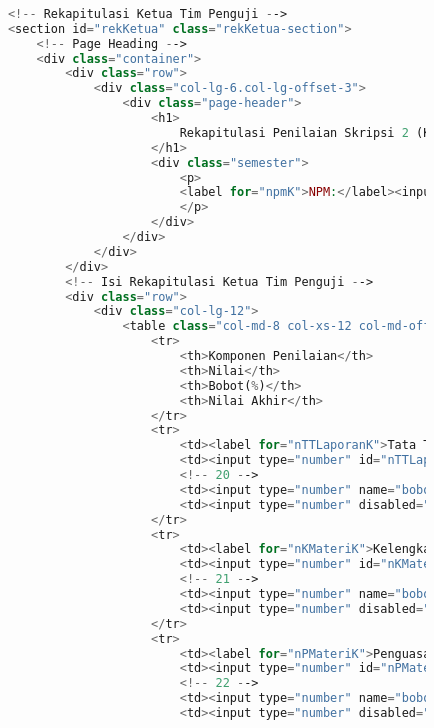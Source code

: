 \begin{lstlisting}[language=PHP,basicstyle=\tiny,caption=skripsi.php]
			
			<!-- Rekapitulasi Ketua Tim Penguji -->
			<section id="rekKetua" class="rekKetua-section">
				<!-- Page Heading -->
				<div class="container">
					<div class="row">
						<div class="col-lg-6.col-lg-offset-3">
							<div class="page-header">
								<h1>
									Rekapitulasi Penilaian Skripsi 2 (Ketua Tim Penguji)
								</h1>
								<div class="semester">
									<p> 
									<label for="npmK">NPM:</label><input id="nmpK" maxlength="10" value="{{ n_npm}}" disabled="disabled" />
									</p>
								</div>
							</div>
						</div>
					</div>
					<!-- Isi Rekapitulasi Ketua Tim Penguji -->
					<div class="row">
						<div class="col-lg-12">
							<table class="col-md-8 col-xs-12 col-md-offset-4 col-md-pull-2 table-responsive">
								<tr>
									<th>Komponen Penilaian</th>
									<th>Nilai</th>
									<th>Bobot(%)</th> 
									<th>Nilai Akhir</th>
								</tr>
								<tr>
									<td><label for="nTTLaporanK">Tata Tulis Laporan</label></td>
									<td><input type="number" id="nTTLaporanK" max="100" ng-model="nilai_TTLaporanK" class="form-nilai"/></td>
									<!-- 20 -->
									<td><input type="number" name="bobotTataTulisLaporanKetua" ng-model="TTLaporanK.value" ng-init="TTLaporanK.value = 15" min="0" max="100" class="form-nilai" readonly="readonly" /></td>
									<td><input type="number" disabled="disabled" value="{{nilai_TTLaporanK * TTLaporanK.value / 100}}" ng-model="total_TTLaporanK" class="form-nilai"/></td>
								</tr>
								<tr>
									<td><label for="nKMateriK">Kelengkapan Materi</label></td>
									<td><input type="number" id="nKMateriK" max="100" ng-model="nilai_KMateriK" class="form-nilai"/></td>
									<!-- 21 -->
									<td><input type="number" name="bobotKelengkapanMateriKetua" ng-model="KMateriK.value" ng-init="KMateriK.value = 10" min="0" max="100" class="form-nilai" readonly="readonly" /></td>
									<td><input type="number" disabled="disabled" value="{{nilai_KMateriK * KMateriK.value / 100}}" ng-model="total_KMateriK" class="form-nilai"/></td>
								</tr>
								<tr>
									<td><label for="nPMateriK">Penguasaan Materi</label></td>
									<td><input type="number" id="nPMateriK" max="100" ng-model="nilai_PMateriK" class="form-nilai"/></td>
									<!-- 22 -->
									<td><input type="number" name="bobotPenguasaanMateriKetua" ng-model="PMateriK.value" ng-init="PMateriK.value = 30" min="0" max="100" class="form-nilai" readonly="readonly" /></td>
									<td><input type="number" disabled="disabled" value="{{nilai_PMateriK * PMateriK.value / 100}}" ng-model="total_PMateriA" class="form-nilai"/></td>

\end{lstlisting}

